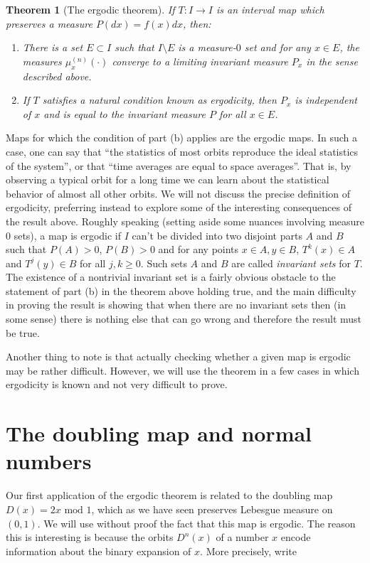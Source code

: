 \documentclass[11pt]{report}
\theoremstyle{plain}
\newtheorem{thm}{Theorem}[chapter]
\theoremstyle{definition}
\begin{document}
\begin{thm}[The ergodic theorem]
If $T:I\to I$ is an interval map which preserves a
measure $P(dx)=f(x)dx$, then:

\begin{enumerate}[label=\arabic*.]
\item There is a set $E\subset I$ such that $I\setminus E$
is a measure-$0$ set and for any $x\in E$, the
measures $\mu_x^{(n)}(\cdot)$ converge to a limiting
invariant measure $P_x$ in the sense described above.

\item If $T$ satisfies a natural condition known as
ergodicity, then $P_x$ is independent of $x$ and is
equal to the invariant measure $P$ for all $x\in E$.
\end{enumerate}

\end{thm}

Maps for which the condition of part (b) applies are
the ergodic maps. In such a case, one can say that
``the statistics of most orbits reproduce the ideal
statistics of the system'', or that ``time averages
are equal to space averages''. That is, by observing a
typical orbit for a long time we can learn about the
statistical behavior of almost all other orbits. We
will not discuss the precise definition of ergodicity,
preferring instead to explore some of the interesting
consequences of the result above. Roughly speaking
(setting aside some nuances involving measure 0 sets),
a map is ergodic if $I$ can't be divided into two
disjoint parts $A$ and $B$ such that $P(A)>0$,
$P(B)>0$ and for any points $x\in A, y\in B$,
$T^k(x)\in A$ and $T^j(y) \in B$ for all $j,k\ge 0$.
Such sets $A$ and $B$ are called \emph{invariant sets} for
$T$. The existence of a nontrivial invariant set is a
fairly obvious obstacle to the statement of part (b)
in the theorem above holding true, and the main
difficulty in proving the result is showing that when
there are no invariant sets then (in some sense) there
is nothing else that can go wrong and therefore the
result must be true.

Another thing to note is that actually checking
whether a given map is ergodic may be rather
difficult. However, we will use the theorem in a few
cases in which ergodicity is known and not very
difficult to prove.

\section{The doubling map and normal numbers}
\label{sec:normalnumbers}
Our first application of the ergodic theorem is
related to the doubling map $D(x)=2x\textrm{ mod }1$,
which as we have seen preserves Lebesgue measure on
$(0,1)$. We will use without proof the fact that this
map is ergodic. The reason this is interesting is
because the orbits $D^n(x)$ of a number $x$ encode
information about the binary expansion of $x$. More
precisely, write
\end{document}
